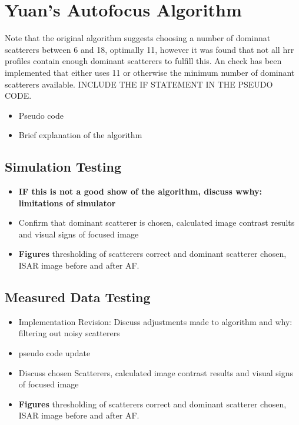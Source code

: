 \documentclass[class=report,11pt,crop=false]{standalone}
\begin{document}
\section{Yuan's Autofocus Algorithm}
Note that the original algorithm suggests choosing a number of dominnat scatterers between 6 and 18, optimally 11, however it was found that not all \gls{hrr} profiles contain enough dominant scatterers to fulfill this. An check has been implemented that either uses 11 or otherwise the minimum number of dominant scatterers available. INCLUDE THE IF STATEMENT IN THE PSEUDO CODE.
\begin{itemize}
    \item Pseudo code 
    \item Brief explanation of the algorithm
\end{itemize}
 
    \subsection{Simulation Testing}
    \begin{itemize}
        \item \textbf{IF this is not a good show of the algorithm, discuss wwhy: limitations of simulator}
        \item Confirm that dominant scatterer is chosen, calculated image contrast results and visual signs of focused image
        \item \textbf{Figures} thresholding of scatterers correct and dominant scatterer chosen, ISAR image before and after AF.
    \end{itemize}
    \subsection{Measured Data Testing}
    \begin{itemize}
        \item Implementation Revision: Discuss adjustments made to algorithm and why: filtering out noisy scatterers
        \item pseudo code update
        \item Discuss chosen Scatterers, calculated image contrast results and visual signs of focused image
        \item \textbf{Figures} thresholding of scatterers correct and dominant scatterer chosen, ISAR image before and after AF.
    \end{itemize}
\end{document}
